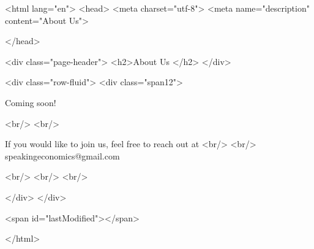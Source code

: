 <html lang="en">
  <head>
    <meta charset="utf-8">
    <meta name="description" content="About Us">
  
  </head>

        

<div class="page-header">
  <h2>About Us </h2>
</div>

<div class="row-fluid">
  <div class="span12">
  
 Coming soon!
 
 <br/>
<br/>

    
    If you would like to join us, feel free to reach out at
    <br/>
    <br/>
    speakingeconomics@gmail.com

 

<br/>
<br/>
<br/>

  
  </div>
</div>


       
     
  <span id="lastModified"></span>


</html>